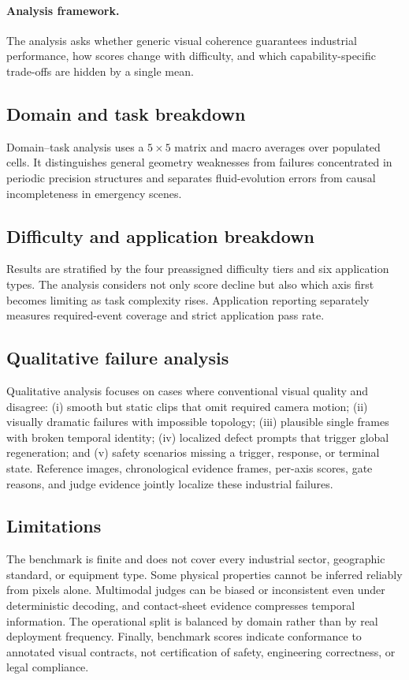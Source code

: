 \paragraph{Analysis framework.}
The analysis asks whether generic visual coherence guarantees industrial performance, how scores change with difficulty, and which capability-specific trade-offs are hidden by a single mean.

\subsection{Domain and task breakdown}

Domain--task analysis uses a $5\times5$ matrix and macro averages over populated cells. It distinguishes general geometry weaknesses from failures concentrated in periodic precision structures and separates fluid-evolution errors from causal incompleteness in emergency scenes.

\subsection{Difficulty and application breakdown}

Results are stratified by the four preassigned difficulty tiers and six application types. The analysis considers not only score decline but also which axis first becomes limiting as task complexity rises. Application reporting separately measures required-event coverage and strict application pass rate.

\subsection{Qualitative failure analysis}

Qualitative analysis focuses on cases where conventional visual quality and \FORGE{} disagree: (i) smooth but static clips that omit required camera motion; (ii) visually dramatic failures with impossible topology; (iii) plausible single frames with broken temporal identity; (iv) localized defect prompts that trigger global regeneration; and (v) safety scenarios missing a trigger, response, or terminal state. Reference images, chronological evidence frames, per-axis scores, gate reasons, and judge evidence jointly localize these industrial failures.

\subsection{Limitations}

The benchmark is finite and does not cover every industrial sector, geographic standard, or equipment type. Some physical properties cannot be inferred reliably from pixels alone. Multimodal judges can be biased or inconsistent even under deterministic decoding, and contact-sheet evidence compresses temporal information. The operational split is balanced by domain rather than by real deployment frequency. Finally, benchmark scores indicate conformance to annotated visual contracts, not certification of safety, engineering correctness, or legal compliance.
